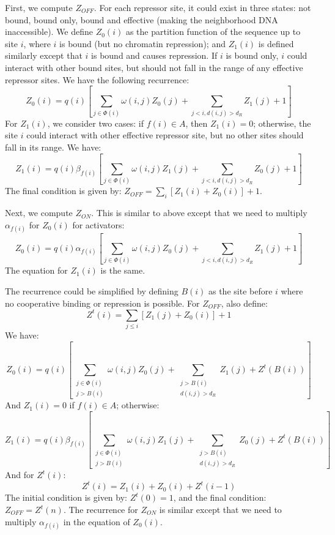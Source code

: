 \documentclass[11pt]{article}
\begin{document}
\begin{enumerate}
\begin{enumerate}
First, we compute $Z_{OFF}$. For each repressor site, it could exist in three states: not bound, bound only, bound and effective (making the neighborhood DNA inaccessible). We define $Z_0(i)$ as the partition function of the sequence up to site $i$, where $i$ is bound (but no chromatin repression); and $Z_1(i)$ is defined similarly except that $i$ is bound and causes repression. If $i$ is bound only, $i$ could interact with other bound sites, but should not fall in the range of any effective repressor sites. We have the following recurrence: 
\begin{equation}
Z_0(i) = q(i) \left[ \sum_{j \in \Phi(i)}\omega(i,j) Z_0(j) + \sum_{j<i, d(i,j)>d_R} Z_1(j) + 1	\right]
\end{equation}
For $Z_1(i)$, we consider two cases: if $f(i) \in A$, then $Z_1(i) = 0$; otherwise, the site $i$ could interact with other effective repressor site, but no other sites should fall in its range. We have: 
\begin{equation}
Z_1(i) = q(i) \beta_{f(i)} \left[ \sum_{j \in \Phi(i)}\omega(i,j) Z_1(j) + \sum_{j<i, d(i,j)>d_R} Z_0(j) + 1	\right]
\end{equation}
The final condition is given by: $Z_{OFF} = \sum_i \left[ Z_1(i) + Z_0(i) \right] + 1$. 

Next, we compute $Z_{ON}$. This is similar to above except that we need to multiply $\alpha_{f(i)}$ for $Z_0(i)$ for activators: 
\begin{equation}
Z_0(i) = q(i) \alpha_{f(i)} \left[ \sum_{j \in \Phi(i)}\omega(i,j) Z_0(j) + \sum_{j<i, d(i,j)>d_R} Z_1(j) + 1	\right]
\end{equation} 
The equation for $Z_1(i)$ is the same. 

The recurrence could be simplified by defining $B(i)$ as the site before $i$ where no cooperative binding or repression is possible. For $Z_{OFF}$, also define: 
\begin{equation}
Z^t(i) = \sum_{j \leq i} \left[ Z_1(j) + Z_0(i) \right] + 1
\end{equation}
We have: 
\begin{equation}
Z_0(i) = q(i) \left[ \sum_{\substack{j \in \Phi(i)\\j > B(i)}} \omega(i,j) Z_0(j) + \sum_{\substack{j > B(i)\\d(i,j) > d_R}} Z_1(j) + Z^t(B(i)) \right]	
\end{equation}
And $Z_1(i) = 0$ if $f(i) \in A$; otherwise: 
\begin{equation}
Z_1(i) = q(i) \beta_{f(i)} \left[ \sum_{\substack{j \in \Phi(i)\\j > B(i)}} \omega(i,j) Z_1(j) + \sum_{\substack{j > B(i)\\d(i,j) > d_R}} Z_0(j) + Z^t(B(i)) \right]	
\end{equation}
And for $Z^t(i)$: 
\begin{equation}
Z^t(i) = Z_1(i) + Z_0(i) + Z^t(i-1)
\end{equation}
The initial condition is given by: $Z^t(0) = 1$, and the final condition: $Z_{OFF} = Z^t(n)$. The recurrence for $Z_{ON}$ is similar except that we need to multiply $\alpha_{f(i)}$ in the equation of $Z_0(i)$. 


\end{enumerate}
\end{enumerate}
\end{document}
